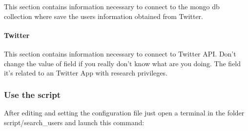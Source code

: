 \documentclass[letterpaper,10pt,english]{sphinxmanual}
\begin{document}
\sphinxAtStartPar
This section contains information necessary to connect to the mongo db collection where save the users information obtained from Twitter.


\paragraph{Twitter}
\label{\detokenize{guide/user_search_guide:twitter}}
\begin{sphinxVerbatim}[commandchars=\\\{\}]
         
         
\end{sphinxVerbatim}

\sphinxAtStartPar
This section contains information necessary to connect to Twitter API.
Don’t change the value of  field if you really don’t know what are you doing.
The  field it’s related to an Twitter App with research privileges.


\subsubsection{Use the script}
\label{\detokenize{guide/user_search_guide:use-the-script}}
\sphinxAtStartPar
After editing and setting the configuration file just open a terminal in the folder script/search\_users and launch this command:

\begin{sphinxVerbatim}[commandchars=\\\{\}]
 
\end{sphinxVerbatim}
\end{document}
